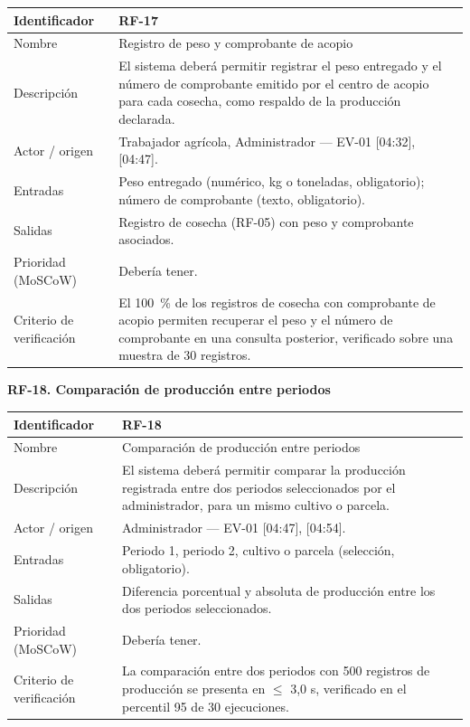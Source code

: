 \documentclass[12pt,a4paper]{article}
\begin{document}
\begin{center}
\begin{longtable}{|p{3.5cm}|p{10.7cm}|}
\hline
Identificador & RF-17 \\
\hline
Nombre & Registro de peso y comprobante de acopio \\
\hline
Descripción & El sistema deberá permitir registrar el peso entregado y el número de comprobante emitido por el centro de acopio para cada cosecha, como respaldo de la producción declarada. \\
\hline
Actor / origen & Trabajador agrícola, Administrador --- EV-01 [04:32], [04:47]. \\
\hline
Entradas & Peso entregado (numérico, kg o toneladas, obligatorio); número de comprobante (texto, obligatorio). \\
\hline
Salidas & Registro de cosecha (RF-05) con peso y comprobante asociados. \\
\hline
Prioridad (MoSCoW) & Debería tener. \\
\hline
Criterio de verificación & El 100~\% de los registros de cosecha con comprobante de acopio permiten recuperar el peso y el número de comprobante en una consulta posterior, verificado sobre una muestra de 30 registros. \\
\hline
\end{longtable}
\end{center}

\bigskip
\noindent\textbf{RF-18. Comparación de producción entre periodos}
\label{tab:RF-18}

\begin{center}
\begin{longtable}{|p{3.5cm}|p{10.7cm}|}
\hline
Identificador & RF-18 \\
\hline
Nombre & Comparación de producción entre periodos \\
\hline
Descripción & El sistema deberá permitir comparar la producción registrada entre dos periodos seleccionados por el administrador, para un mismo cultivo o parcela. \\
\hline
Actor / origen & Administrador --- EV-01 [04:47], [04:54]. \\
\hline
Entradas & Periodo 1, periodo 2, cultivo o parcela (selección, obligatorio). \\
\hline
Salidas & Diferencia porcentual y absoluta de producción entre los dos periodos seleccionados. \\
\hline
Prioridad (MoSCoW) & Debería tener. \\
\hline
Criterio de verificación & La comparación entre dos periodos con 500 registros de producción se presenta en $\leq$ 3,0 s, verificado en el percentil 95 de 30 ejecuciones. \\
\hline
\end{longtable}
\end{center}
\end{document}

